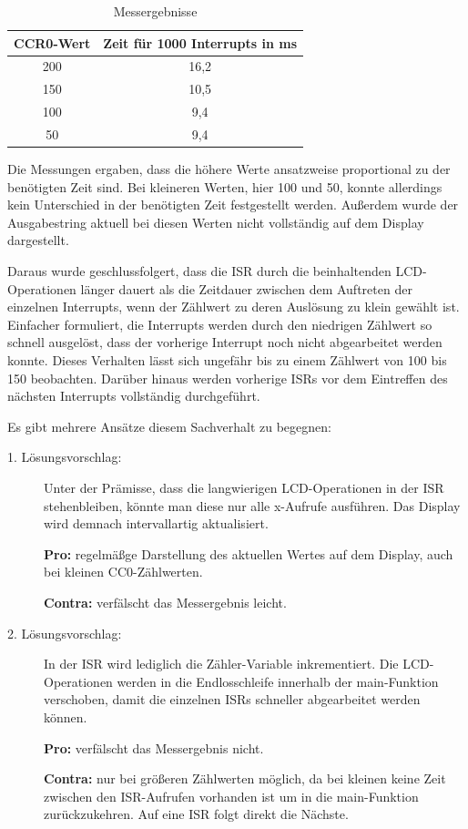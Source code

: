 \documentclass[12pt,a4paper,bibliography=totocnumbered,listof=totocnumbered]{scrartcl}
\begin{document}
\begin{table}[!htb]
	\centering
	\begin{tabular}{@{}c|c@{}}
		\toprule
		CCR0-Wert & Zeit für 1000 Interrupts in ms \\ \midrule
		200       & 16,2                           \\
		150       & 10,5                           \\
		100       & 9,4                            \\
		50        & 9,4                            \\ \bottomrule
	\end{tabular}
	\caption{Messergebnisse}
\end{table}

Die Messungen ergaben, dass die höhere Werte ansatzweise proportional zu der benötigten Zeit sind. Bei kleineren Werten, hier 100 und 50, konnte allerdings kein Unterschied in der benötigten Zeit festgestellt werden. Außerdem wurde der Ausgabestring \glqq aktuell \grqq{} bei diesen Werten nicht vollständig auf dem Display dargestellt.

Daraus wurde geschlussfolgert, dass die ISR durch die beinhaltenden LCD-Operationen länger dauert als die Zeitdauer zwischen dem Auftreten der einzelnen Interrupts, wenn der Zählwert zu deren Auslösung zu klein gewählt ist. Einfacher formuliert, die Interrupts werden durch den niedrigen Zählwert so schnell ausgelöst, dass der vorherige Interrupt noch nicht abgearbeitet werden konnte. Dieses Verhalten lässt sich ungefähr bis zu einem Zählwert von 100 bis 150 beobachten. Darüber hinaus werden vorherige ISRs vor dem Eintreffen des nächsten Interrupts vollständig durchgeführt.


Es gibt mehrere Ansätze diesem Sachverhalt zu begegnen:
\begin{description}
	\item[1. Lösungsvorschlag:] Unter der Prämisse, dass die langwierigen LCD-Operationen in der ISR stehenbleiben, könnte man diese nur alle x-Aufrufe ausführen. Das Display wird demnach intervallartig aktualisiert.
	
	\textbf{Pro:} regelmäßge Darstellung des aktuellen Wertes auf dem Display, auch bei kleinen CC0-Zählwerten.
	
	\textbf{Contra:} verfälscht das Messergebnis leicht. 
	
	\item[2. Lösungsvorschlag:] In der ISR wird lediglich die Zähler-Variable inkrementiert. Die LCD-Operationen werden in die Endlosschleife innerhalb der main-Funktion verschoben, damit die einzelnen ISRs schneller abgearbeitet werden können.
	
	\textbf{Pro:} verfälscht das Messergebnis nicht.
	
	\textbf{Contra:} nur bei größeren Zählwerten möglich, da bei kleinen keine Zeit zwischen den ISR-Aufrufen vorhanden ist um in die main-Funktion zurückzukehren. Auf eine ISR folgt direkt die Nächste.
\end{description}
\end{document}
